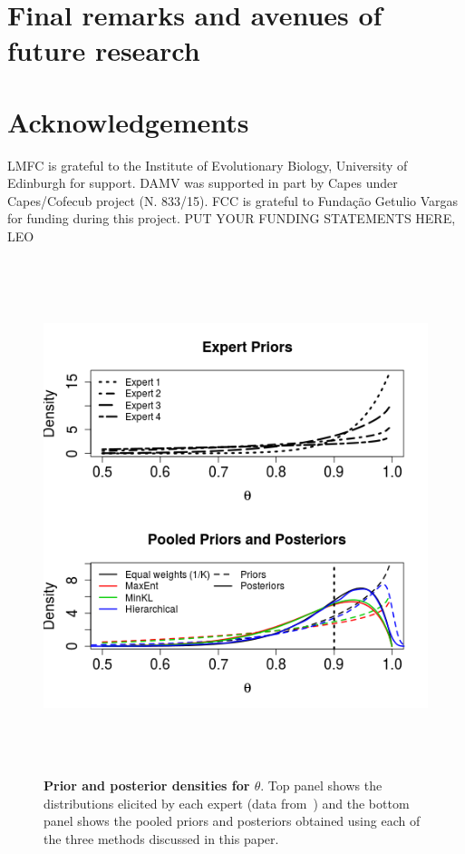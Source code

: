 \documentclass[a4paper, notitlepage, 10pt]{article}
\begin{document}
\section*{Final remarks and avenues of future research}
\section*{Acknowledgements}
LMFC is grateful to the Institute of Evolutionary Biology, University of Edinburgh for support.
DAMV was supported in part by Capes under Capes/Cofecub project (N. 833/15).
FCC is grateful to Funda\c{c}\~ao Getulio Vargas for funding during this 
project.
PUT YOUR FUNDING STATEMENTS HERE, LEO


\begin{figure}[!ht]
\centering
\includegraphics[width=\textwidth, height = 15cm]{figures/priors_&_posteriors.png}
\caption{\textbf{Prior and posterior densities for $\theta$}.
Top panel shows the distributions elicited by each expert (data from~\cite{savchuk1994}) and the bottom panel shows the pooled priors and posteriors obtained using each of the three methods discussed in this paper.}
\label{fig:priors_posteriors_beta}
\end{figure}
\end{document}
